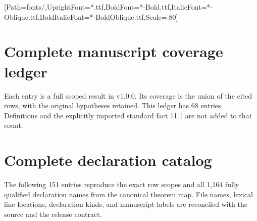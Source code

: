 

\usepackage{komorebi-monograph}
\renewcommand{\KomorebiKind}{Lean and evidence guide}
\renewcommand{\KomorebiSubtitle}{Cyclic analytic functions, reciprocal families,\\and spectral zero data}
\renewcommand{\KomorebiShortTitle}{Paper IV / Lean guide}
\renewcommand{\KomorebiCoverBlurb}{Read the exact source declarations, follow each realization bridge, and distinguish preserved kernel evidence from current static checks.}
\KomorebiSetup
\setlength{\cftsubsecnumwidth}{4.4em}
\setmonofont{DejaVuSansMono}[Path=fonts/,UprightFont=*.ttf,BoldFont=*-Bold.ttf,ItalicFont=*-Oblique.ttf,BoldItalicFont=*-BoldOblique.ttf,Scale=.80]

\KomorebiCover
{}


\begingroup\small
\tableofcontents
\endgroup
\clearpage
{}

\clearpage
\clearpage
\clearpage
\clearpage
\clearpage
\clearpage
\clearpage
\clearpage
\section{Complete manuscript coverage ledger}
\label{sec:ledger}
Each entry is a full scoped result in v1.0.0. Its coverage is the union of the cited rows, with the original hypotheses retained. This ledger has 68 entries. Definitions and the explicitly imported standard fact 11.1 are not added to that count.

\clearpage
\section{Complete declaration catalog}
\label{sec:catalog}
The following 151 entries reproduce the exact row scopes and all 1,164 fully qualified declaration names from the canonical theorem map. File names, lexical line locations, declaration kinds, and manuscript labels are reconciled with the source and the release contract.

